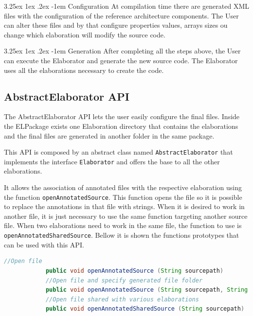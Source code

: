 \documentclass[11pt]{report}
\makeatletter
\renewcommand\paragraph{\@startsection{paragraph}{5}{\z@}%
	{3.25ex \@plus1ex \@minus.2ex}%
	{-1em}%
	{\normalfont\normalsize\bfseries}}
\makeatother
\begin{document}
		\paragraph{Configuration} At compilation time there are generated XML files with the configuration of the reference architecture components. The User can alter these files and by that configure properties values, arrays sizes ou change which elaboration will modify the source code.

		\paragraph{Generation} After completing all the steps above, the User can execute the Elaborator and generate the new source code. The Elaborator uses all the elaborations necessary to create the code.
		
		\subsection{AbstractElaborator API}
		
		\par The AbstractElaborator API lets the user easily configure the final files. Inside the ELPackage exists one Elaboration directory that contains the elaborations and the final files are generated in another folder in the same package.
		\par This API is composed by an abstract class named \texttt{AbstractElaborator} that implements the interface \texttt{Elaborator} and offers the base to all the other elaborations.
		\par It allows the association of annotated files with the respective elaboration using the function \texttt{openAnnotatedSource}. This function opens the file so it is possible to replace the annotations in that file with strings. When it is desired to work in another file, it is just necessary to use the same function targeting another source file. When two elaborations need to work in the same file, the function to use is \texttt{openAnnotatedSharedSource}. Bellow it is shown the functions prototypes that can be used with this API.
		
		\begin{lstlisting}[language=Java]
			//Open file
			public void openAnnotatedSource (String sourcepath)
			//Open file and specify generated file folder
			public void openAnnotatedSource (String sourcepath, String targetPath)
			//Open file shared with various elaborations
			public void openAnnotatedSharedSource (String sourcepath)
		\end{lstlisting}
		
\end{document}
